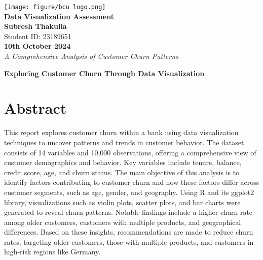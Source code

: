 \documentclass[12pt]{article}
\begin{document}
\begin{titlepage}
    \centering 
    \texttt{[image: figure/bcu logo.png]} \\[1.5cm] %

    {\LARGE \textbf{Data Visualization Assessment}} \\[1.5cm]

    \textbf{Subresh Thakulla} \\[0.5cm]
    Student ID: 23189651 \\[1cm]

    \textbf{10th October 2024} \\[2cm]

    \textit{A Comprehensive Analysis of Customer Churn Patterns} %
\end{titlepage}
\newpage %
\tableofcontents %
\newpage
\listoffigures %
\newpage

\begin{center}
    \LARGE \textbf{Exploring Customer Churn Through Data Visualization}
\end{center}

\vspace{0.5cm}

\section*{Abstract}
\vspace{0.5cm}

This report explores customer churn within a bank using data visualization techniques to uncover patterns and trends in customer behavior. The dataset consists of 14 variables and 10,000 observations, offering a comprehensive view of customer demographics and behavior. Key variables include tenure, balance, credit score, age, and churn status. The main objective of this analysis is to identify factors contributing to customer churn and how these factors differ across customer segments, such as age, gender, and geography. Using R and its ggplot2 library, visualizations such as violin plots, scatter plots, and bar charts were generated to reveal churn patterns. Notable findings include a higher churn rate among older customers, customers with multiple products, and geographical differences. Based on these insights, recommendations are made to reduce churn rates, targeting older customers, those with multiple products, and customers in high-risk regions like Germany.
\end{document}
